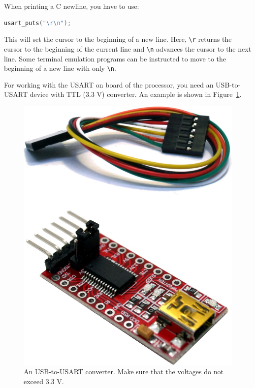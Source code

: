 \documentclass[12pt]{article}
\begin{document}
When printing a C newline, you have to use:

\begin{lstlisting}[language=C]
usart_puts("\r\n");
\end{lstlisting}

This will set the cursor to the beginning of a new line. Here, \lstinline|\r| returns the cursor to the beginning of the current line and \lstinline|\n| advances the cursor to the next line. Some terminal emulation programs can be instructed to move to the beginning of a new line with only \lstinline|\n|.

For working with the USART on board of the processor, you need an USB-to-USART device with TTL (3.3 V) converter. An example is shown in Figure~\ref{fig:usb-usart-ttl}.

\begin{figure}[!ht]
\centering
\includegraphics[scale=0.1]{usb-usart-ttl}
\caption{An USB-to-USART converter. Make sure that the voltages do not exceed 3.3 V.}
\label{fig:usb-usart-ttl}
\end{figure}
\end{document}
